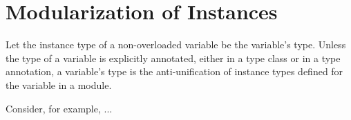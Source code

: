 \section{Modularization of Instances}
\label{sec:modular-instances}

Let the instance type of a non-overloaded variable be the variable's
type. Unless the type of a variable is explicitly annotated, either in
a type class or in a type annotation, a variable's type is the
anti-unification of instance types defined for the variable in a
module.

Consider, for example, ...

